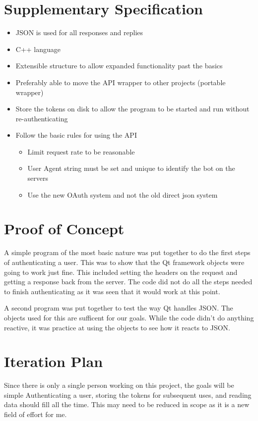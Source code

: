 \documentclass[12pt]{article}
\begin{document}
\section{Supplementary Specification}

\begin{itemize}
	\item JSON is used for all responses and replies
	\item C++ language
	\item Extensible structure to allow expanded functionality past the basics
	\item Preferably able to move the API wrapper to other projects (portable wrapper)
	\item Store the tokens on disk to allow the program to be started and run without re-authenticating
	\item Follow the basic rules for using the API
	\begin{itemize}
		\item Limit request rate to be reasonable
		\item User Agent string must be set and unique to identify the bot on the servers
		\item Use the new OAuth system and not the old direct json system
	\end{itemize}
\end{itemize}

\section{Proof of Concept}

A simple program of the most basic nature was put together to do the first steps of authenticating a user.
This was to show that the Qt framework objects were going to work just fine.
This included setting the headers on the request and getting a response back from the server.
The code did not do all the steps needed to finish authenticating as it was seen that it would work at this point.

A second program was put together to test the way Qt handles JSON.
The objects used for this are sufficent for our goals.
While the code didn't do anything reactive, it was practice at using the objects to see how it reacts to JSON.

\section{Iteration Plan}

Since there is only a single person working on this project, the goals will be simple
Authenticating a user, storing the tokens for subsequent uses, and reading data should fill all the time.
This may need to be reduced in scope as it is a new field of effort for me.
\end{document}
